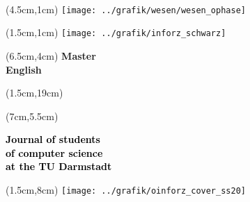 \begin{titlepage}~





    \begin{textblock*}{12cm}(4.5cm,1cm)
        \texttt{[image: ../grafik/wesen/wesen\_ophase]}
    \end{textblock*}

    \begin{textblock*}{12cm}(1.5cm,1cm)
        \texttt{[image: ../grafik/inforz\_schwarz]}
    \end{textblock*}



    \begin{textblock*}{12cm}(6.5cm,4cm)
        \centering\fontsize{80}{25}\sffamily\textbf{
            \textcolor{mycolor}{Master } \\
            \textcolor{mycolor}{English}}
    \end{textblock*}


    \begin{textblock*}{12cm}(1.5cm,19cm)
        \centering\huge\sffamily\textbf{
        }
    \end{textblock*}


    \begin{textblock*}{7cm}(7cm,5.5cm)
        \begin{flushright}
            \large\sffamily\textbf{
                \textcolor{black}{Journal of students}\\
                \textcolor{black}{of computer science\\at the TU Darmstadt}}
        \end{flushright}
    \end{textblock*}

    \begin{textblock*}{18cm}(1.5cm,8cm)
        \texttt{[image: ../grafik/oinforz\_cover\_ss20]}
    \end{textblock*}


\end{titlepage}
